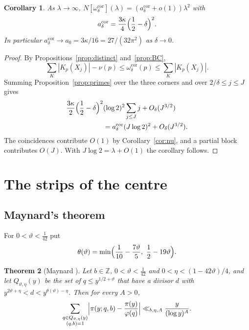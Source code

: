 \documentclass[aps,prd,twocolumn,superscriptaddress,nofootinbib,longbibliography,floatfix,showkeys,nobalancelastpage,amsmath,amssymb,10pt]{revtex4-2}
\theoremstyle{plain}
\newtheorem{theorem}{Theorem}[section]
\newtheorem{corollary}[theorem]{Corollary}
\theoremstyle{definition}
\theoremstyle{plain}
\begin{document}
\begin{corollary}\label{cor:density}
As $\lambda\to\infty$, $N[\omega^{\mathrm{cor}}_\delta](\lambda)=(a^{\mathrm{cor}}_\delta+o(1))\lambda^2$ with
\[
a^{\mathrm{cor}}_\delta=\frac{3\kappa}4\Bigl(\frac12-\delta\Bigr)^2.
\]
In particular $a^{\mathrm{cor}}_\delta\to a_0=3\kappa/16=27/(32\pi^2)$ as $\delta\to0$.
\end{corollary}

\begin{proof}
By Propositions~\ref{prop:distinct} and~\ref{prop:BC},
\[
\sum_K|K_p(X_j)|-\nu(p)\le\omega^{\mathrm{cor}}_\delta(p)\le\sum_K|K_p(X_j)|.
\]
Summing Proposition~\ref{prop:primes} over the three corners and over $2/\delta\le j\le J$ gives
\begin{align*}
\frac{3\kappa}2\Bigl(\frac12-\delta\Bigr)^2&(\log2)^2\sum_{j\le J}j+O_\delta(J^{3/2})\\
&=a^{\mathrm{cor}}_\delta(J\log2)^2+O_\delta(J^{3/2}).
\end{align*}
The coincidences contribute $O(1)$ by Corollary~\ref{cor:nu}, and a partial block contributes $O(J)$. With $J\log2=\lambda+O(1)$ the corollary follows.
\end{proof}

\section{The strips of the centre}\label{sec:strips}

\subsection{Maynard's theorem}

For $0<\vartheta<\frac1{42}$ put
\begin{equation}\label{eq:theta}
\theta(\vartheta)=\min\Bigl(\frac1{10}-\frac{7\vartheta}5,\ \frac12-19\vartheta\Bigr).
\end{equation}

\begin{theorem}[Maynard {\cite[Corollary~1.2]{May}}]\label{thm:maynard}
Let $b\in\mathbb Z$, $0<\vartheta<\frac1{42}$ and $0<\eta<(1-42\vartheta)/4$, and let $Q_{\vartheta,\eta}(y)$ be the set of $q\le y^{1/2+\vartheta}$ that have a divisor $d$ with $y^{2\vartheta+\eta}<d<y^{\theta(\vartheta)-\eta}$. Then for every $A>0$,
\[
\sum_{\substack{q\in Q_{\vartheta,\eta}(y)\\(q,b)=1}}\Bigl|\pi(y;q,b)-\frac{\pi(y)}{\varphi(q)}\Bigr|\ll_{b,\eta,A}\frac y{(\log y)^A}.
\]
\end{theorem}
\end{document}
